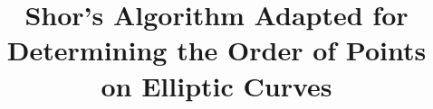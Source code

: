 \documentclass[aps,prx,twocolumn, superscriptaddress]{revtex4-2}
\begin{document}

\title{Shor’s Algorithm Adapted for Determining the Order of Points on Elliptic Curves}




\maketitle










\end{document}
